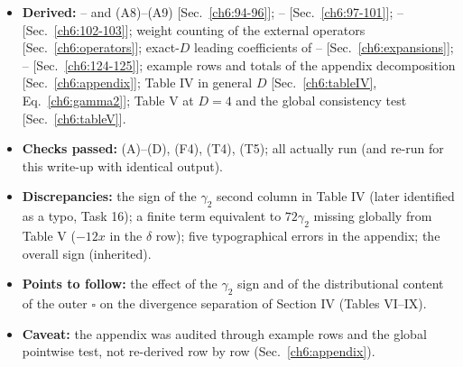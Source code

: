 {\raggedright
\begin{itemize}[leftmargin=14pt]
\item \textbf{Derived:} -- and (A8)--(A9) [Sec.~\ref{ch6:94-96}]; -- [Sec.~\ref{ch6:97-101}]; --
[Sec.~\ref{ch6:102-103}]; weight counting of the external operators [Sec.~\ref{ch6:operators}]; exact-$D$ leading coefficients of --
[Sec.~\ref{ch6:expansions}]; -- [Sec.~\ref{ch6:124-125}]; example rows and totals of the appendix decomposition
[Sec.~\ref{ch6:appendix}]; Table IV in general $D$ [Sec.~\ref{ch6:tableIV}, Eq.~\eqref{ch6:gamma2}]; Table V at $D=4$ and the global
consistency test [Sec.~\ref{ch6:tableV}].
\item \textbf{Checks passed:} (A)--(D), (F4), (T4), (T5); all actually run (and re-run for this write-up with identical output).
\item \textbf{Discrepancies:} the sign of the $\gamma_2$ second column in Table IV (later identified as a typo, Task 16); a finite term
equivalent to $72\gamma_2$ missing globally from Table V ($-12x$ in the $\delta$ row); five typographical errors in the appendix; the overall sign
(inherited).
\item \textbf{Points to follow:} the effect of the $\gamma_2$ sign and of the distributional content of the outer $\square$ on the divergence
separation of Section IV (Tables VI--IX).
\item \textbf{Caveat:} the appendix was audited through example rows and the global pointwise test, not re-derived row by row
(Sec.~\ref{ch6:appendix}).
\end{itemize}
\par}
